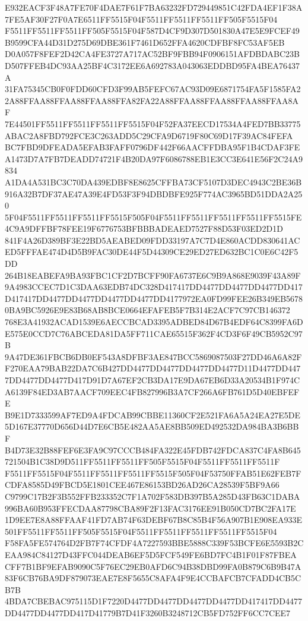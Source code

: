 \documentclass[UTF8,fontset=fandol,zihao=-4,a4paper]{ctexart}
\begin{document}
{{E932EACF3F48A7FE70F4DAE7F61F7BA63232FD729449851C42FDA4EF1F38A7FE5AF30F27F0A7E6511FF5515F04F5511FF5511FF5511FF505F5515F04
F5511FF5511FF5511FF505F5515F04F587D4CF9D307D501830A47E5E9FCEF49B9599CFA44D31D275D69DBE361F7461D652FFA4620CDFBF8FC53AF5EB
D0A057F8FEF2D42CA4FE3727A717AC52BF9FBB94F0906151AFDBDABC23BD507FFEB4DC93AA25BF4C3172EE6A692783A043063EDDBD95FA4BEA76437A
31FA75345CB0F0FDD60CFD3F99AB5FEFC67AC93D09E6871754FA5F1585FA22A88FFAA88FFAA88FFAA88FFA82FA22A88FFAA88FFAA88FFAA88FFAA8AF
7E44501FF5511FF5511FF5511FF5515F04F52FA37EECD17534A4FED7BB33775ABAC2A8FBD792FCE3C263ADD5C29CFA9D6719F80C69D17F39AC84FEFA
BC7FBD9DFEADA5EFAB3FAFF0796DF442F66AACFFDBA95F1B4CDAF3FEA1473D7A7FB7DEADD74721F4B20DA97F6086788EB1E3CC3E641E56F2C24A9834
A1DA4A531BC3C70DA439EDBF8E8625CFFBA73CF5107D3DEC4943C2BE36B916A32B7DF37AE47A39E4FD53F3F94DBDBFE925F774AC3965BD51DDA2A250
5F04F5511FF5511FF5511FF5515F505F04F5511FF5511FF5511FF5511FF5515FE4C9A9DFFBF78FEE19F6776753BFBBBADEAED7527F88D53F03ED2D1D
841F4A26D389BF3E22BD5AEABED09FDD33197A7C7D4E860ACDD830641ACED5FFFAE474D4D5B9FAC30DE44F5D44309CE29ED27ED632BC1C0E6C42F5DD
264B18EABEFA9BA93FBC1CF2D7BCFF90FA6737E6C9B9A868E9039F43A89F9A4983CCEC7D1C3DAA63EDB74DC328D417417DD4477DD4477DD4477DD417
D417417DD4477DD4477DD4477DD4477DD4177972EA0FD99FEE26B349EB56780BA9BC5926E9E83B68AB8BCE0664EFAFEB5F7B314E2ACF7C97CB146372
768E3A41932ACAD1539E6AECCBCAD3395ADBED84D67B4EDF64C8399FA6DE575E0CCD7C76ABCEDA81DA5FF711CAE65515F362F4CD3F6F49CB5952C97B
9A47DE361FBCB6DB0EF543A8DFBF3AE847BCC5869087503F27DD46A6A82FF270EAA79BAB22DA7C6B427DD4477DD4477DD4477DD4477D11D4477DD447
7DD4477DD4477D417D91D7A67EF2CB3DA17E9DA67EB6D33A20534B1F974CA6139F84ED3AB7AACF709EEC4FB827996B3A7CF266A6FB761D5D40EBFEFE
B9E1D7333599AF7ED9A4FDCAB99CBBE11360CF2E521FA6A5A24EA27E5DE5D167E37770D656D44D7E6CB5E482AA5AE8BB509ED492532DA984BA3B6BBF
B4D73E32B88FEF6E3FA9C97CCCB484FA322E45FDB742FDCA837C4FA8B645721504B1C38D9D511FF5511FF5511FF505F5515F04F5511FF5511FF5511F
F5511FF5515F04F5511FF5511FF5511FF5515F505F04F53750FFAB51E62FEB7FCDFA8585D49FBCD5E1801CEE467E86153BD26AD26CA28539F5BF9A66
C9799C17B2F3B552FFB233352C7F1A702F583DB397B5A285D43FB63C1DABA996BA60B953FFECDAA87798CBA89F2F13FAC3176EE91B050CD7BC2FA17E
1D9EE7E8A88FFAAF41FD7AB74F63DEBF67B8C85B4F56A907B1E908EA933E501FF5511FF5511FF505F5515F04F5511FF5511FF5511FF5511FF5515F04
F58FA5FE574764D2FB7F74CFDF4A7227593BBE5888C339F53BCFE6E5593B2CEAA984C84127D43FFC044DEAB6EF5D5FCF549FE6BD7FC4B1F01F87FBEA
CFF7B1BF9EFAB9090C5F76EC29EB0AFD6C94B38DBD99FA0B879C6B9B47A83F6CB76BA9DF879073EAE7E8F5655C8AFA4F9E4CCBAFCB7CFADD4CB5CB7B
4BDA7CBEBAC975115D1F7220D4477DD4477DD4477DD4477DD417417DD4477DD4477DD4477DD417D41779B7D41F3260B3248712CB5FD752FF6CC7CEE7
}}
\end{document}
